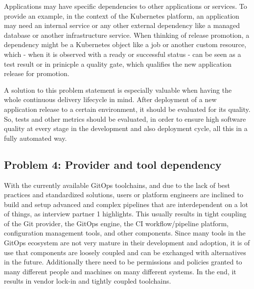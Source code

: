 Applications may have specific dependencies to other applications or services.
To provide an example, in the context of the Kubernetes platform,
an application may need an internal service or any other external
dependency like a managed database or another infrastructure service.
When thinking of release promotion,
a dependency might be a Kubernetes object like a job or another custom resource,
which - when it is observed with a ready or successful status -
can be seen as a test result or in prinicple a quality gate, which qualifies the
new application release for promotion.

A solution to this problem statement is especially valuable when having the whole
continuous delivery lifecycle in mind. After deployment of a new application release
to a certain environment, it should be evaluated for its quality. So, tests
and other metrics should be evaluated, in order to ensure high software quality
at every stage in the development and also deployment cycle,
all this in a fully automated way.

\subsection{Problem 4: Provider and tool dependency}
\label{problem4}

With the currently available GitOps toolchains,
and due to the lack of best practices and standardized solutions,
users or platform engineers are inclined to build
and setup
advanced and complex pipelines that are interdependent on a lot of things,
as interview partner 1 highlights.
This usually results in tight coupling of the Git provider, the GitOps engine, the CI workflow/pipeline platform,
configuration management tools, and other components.
Since many tools in the GitOps ecosystem are not very mature in their development and adoption,
it is of use that components are loosely coupled and can be exchanged with alternatives in the future.
Additionally there need to be permissions and policies granted to many different people and
machines on many different systems.
In the end, it results in vendor lock-in and tightly coupled toolchains.

